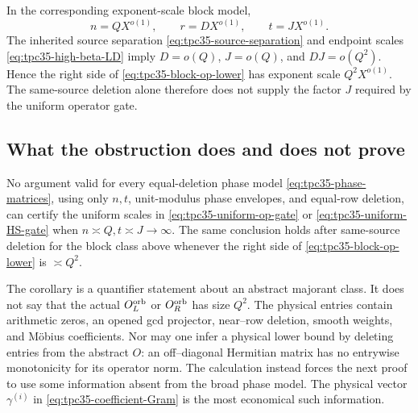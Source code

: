 In the corresponding exponent-scale block model,
\[
 n=QX^{o(1)},\qquad r=DX^{o(1)},\qquad t=JX^{o(1)}.
\]
The inherited source separation
\eqref{eq:tpc35-source-separation} and endpoint scales
\eqref{eq:tpc35-high-beta-LD} imply \(D=o(Q)\), \(J=o(Q)\), and
\(D J=o(Q^2)\).  Hence the right side of
\eqref{eq:tpc35-block-op-lower} has exponent scale \(Q^2X^{o(1)}\).
The same-source deletion alone therefore does not supply the factor \(J\)
required by the uniform operator gate.

\subsection{What the obstruction does and does not prove}

\begin{corollary}
\label{cor:tpc35-uniform-method-boundary}
No argument valid for every equal-deletion phase model
\eqref{eq:tpc35-phase-matrices}, using only \(n,t\), unit-modulus phase
envelopes, and equal-row deletion, can certify the uniform scales in
\eqref{eq:tpc35-uniform-op-gate} or
\eqref{eq:tpc35-uniform-HS-gate} when \(n\asymp Q,t\asymp J\to\infty\).
The same conclusion holds after same-source deletion for the block class
above whenever the right side of \eqref{eq:tpc35-block-op-lower} is
\(\asymp Q^2\).
\end{corollary}

The corollary is a quantifier statement about an abstract majorant class.
It does not say that the actual \(O_L^{\rm orb}\) or \(O_R^{\rm orb}\)
has size \(Q^2\).  The physical entries contain arithmetic zeros, an
opened gcd projector, near--row deletion, smooth weights, and M\"obius
coefficients.  Nor may one infer a physical lower bound by deleting
entries from the abstract \(O\): an off--diagonal Hermitian matrix has no
entrywise monotonicity for its operator norm.  The calculation instead
forces the next proof to use some information absent from the broad
phase model.  The physical vector \(\gamma^{(i)}\) in
\eqref{eq:tpc35-coefficient-Gram} is the most economical such information.
